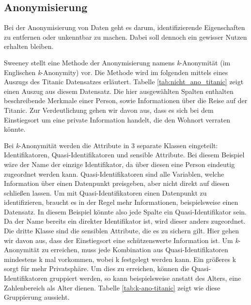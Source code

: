 \subsection{Anonymisierung}\label{sec:anonymisierung}

Bei der Anonymisierung von Daten geht es darum, identifizierende Eigenschaften zu entfernen oder unkenntbar zu machen.
Dabei soll dennoch ein gewisser Nutzen erhalten bleiben. 

Sweeney \cite{P-23} stellt eine Methode der Anonymisierung namens \textit{k}-Anonymität (im Englischen \textit{k}-Anonymity) vor.
Die Methode wird im folgenden mittels eines Auszugs des Titanic Datensatzes \cite{D-titanic} erläutert.
Tabelle \ref{tab:nicht_ano_titanic} zeigt einen Auszug aus diesem Datensatz.
Die hier ausgewählten Spalten enthalten beschreibende Merkmale einer Person, sowie Informationen über die Reise auf der Titanic. 
Zur Verdeutlichung gehen wir davon aus, dass es sich bei dem Einstiegsort um eine private Information handelt, die den Wohnort verraten könnte.



Bei \textit{k}-Anonymität werden die Attribute in 3 separate Klassen eingeteilt: Identifikatoren, Quasi-Identifikatoren und sensible Attribute.
Bei diesem Beispiel wäre der Name der einzige Identifikator, da über diesen eine Person eindeutig zugeordnet werden kann. 
Quasi-Identifikatoren sind alle Variablen, welche Information über einen Datenpunkt preisgeben, aber nicht direkt auf diesen schließen lassen. 
Um mit Quasi-Identifikatoren einen Datenpunkt zu identifizieren, braucht es in der Regel mehr Informationen, beispielsweise einen Datensatz.
In diesem Beispiel könnte also jede Spalte ein Quasi-Identifikator sein.
Da der Name bereits ein direkter Identifikator ist, wird dieser anders zugeordnet.
Die dritte Klasse sind die sensiblen Attribute, die es zu sichern gilt. 
Hier gehen wir davon aus, dass der Einstiegsort eine schützenswerte Information ist.
Um \textit{k}-Anonymität zu erreichen, muss jede Kombination aus Quasi-Identifikatoren mindestens k mal vorkommen, wobei k festgelegt werden kann. 
Ein größeres k sorgt für mehr Privatsphäre.
Um dies zu erreichen, können die Quasi-Identifikatoren gruppiert werden, so kann beispielsweise anstatt des Alters, eine Zahlenbereich als Alter dienen.
Tabelle \ref{tab:k-ano-titanic} zeigt wie diese Gruppierung aussieht.


